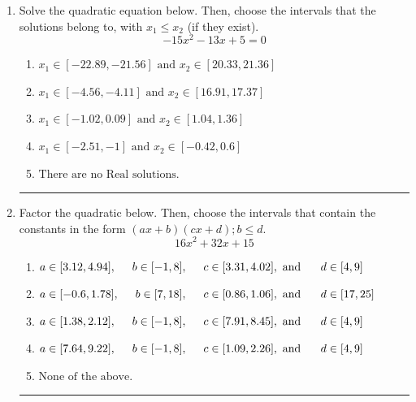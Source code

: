 \documentclass[14pt]{extbook}
\newcommand{\litem}[1]{\item#1\hspace*{-1cm}\rule{\textwidth}{0.4pt}}
\begin{document}
\begin{enumerate}
{\begin{enumerate}[label=\Alph*.]
\end{enumerate} }
\litem{
Solve the quadratic equation below. Then, choose the intervals that the solutions belong to, with $x_1 \leq x_2$ (if they exist).\[ -15x^{2} -13 x + 5 = 0 \]\begin{enumerate}[label=\Alph*.]
\item \( x_1 \in [-22.89, -21.56] \text{ and } x_2 \in [20.33, 21.36] \)
\item \( x_1 \in [-4.56, -4.11] \text{ and } x_2 \in [16.91, 17.37] \)
\item \( x_1 \in [-1.02, 0.09] \text{ and } x_2 \in [1.04, 1.36] \)
\item \( x_1 \in [-2.51, -1] \text{ and } x_2 \in [-0.42, 0.6] \)
\item \( \text{There are no Real solutions.} \)

\end{enumerate} }
\litem{
Factor the quadratic below. Then, choose the intervals that contain the constants in the form $(ax+b)(cx+d); b \leq d.$\[ 16x^{2} +32 x + 15 \]\begin{enumerate}[label=\Alph*.]
\item \( a \in [3.12, 4.94], \hspace*{5mm} b \in [-1, 8], \hspace*{5mm} c \in [3.31, 4.02], \text{ and } \hspace*{5mm} d \in [4, 9] \)
\item \( a \in [-0.6, 1.78], \hspace*{5mm} b \in [7, 18], \hspace*{5mm} c \in [0.86, 1.06], \text{ and } \hspace*{5mm} d \in [17, 25] \)
\item \( a \in [1.38, 2.12], \hspace*{5mm} b \in [-1, 8], \hspace*{5mm} c \in [7.91, 8.45], \text{ and } \hspace*{5mm} d \in [4, 9] \)
\item \( a \in [7.64, 9.22], \hspace*{5mm} b \in [-1, 8], \hspace*{5mm} c \in [1.09, 2.26], \text{ and } \hspace*{5mm} d \in [4, 9] \)
\item \( \text{None of the above.} \)

\end{enumerate} }
\end{enumerate}
\end{document}
